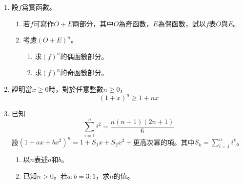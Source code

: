 \documentclass[12pt]{article}
\begin{document}
    \begin{enumerate}
        \item 設$f$爲實函數。\begin{enumerate}
            \item 若$f$可寫作$O+E$兩部分，其中$O$為奇函數，$E$為偶函數，試以$f$表$O$與$E$。
            \item 考慮$(O+E)^n$。\begin{enumerate}
                \item 求$(f)^n$的偶函數部分。
                \item 求$(f)^n$的奇函數部分。
            \end{enumerate}
        \end{enumerate}

        \item 證明當$x\geq 0$時，對於任意整數$n\geq 0$，$$(1+x)^n\geq 1+nx$$
        
        \item 已知$$\sum_{i=1}^{n}i^2=\frac{n(n+1)(2n+1)}{6}$$
        設$(1+ax+bx^2)^n=1+S_1x+S_2x^2+$更高次冪的項。其中$S_k=\sum_{i=1}^{n}i^k$。\begin{enumerate}
            \item 以$n$表述$a$和$b$。
            \item 已知$n>0$。若$a:b=3:1$，求$n$的值。
        \end{enumerate}
    \end{enumerate}
\end{document}
